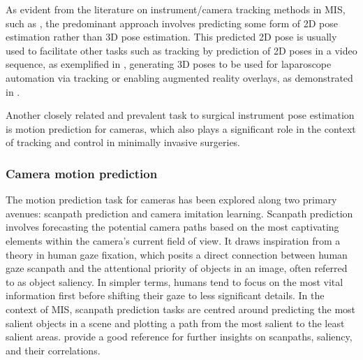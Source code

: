 \documentclass[times,twocolumn,final]{elsarticle}
\begin{document}
As evident from the literature on instrument/camera tracking methods in MIS, such as \citep{art_net,multi_semi_pose,concurrent_segmentation_iro_laina,li2021data}, the predominant approach involves predicting some form of 2D pose estimation rather than 3D pose estimation. This predicted 2D pose is usually used to facilitate other tasks such as tracking by prediction of 2D poses in a video sequence, as exemplified in \citet{concurrent_segmentation_iro_laina}, generating 3D poses to be used for laparoscope automation via tracking \citep{li2021data} or enabling augmented reality overlays, as demonstrated in \citet{art_net}.

Another closely related and prevalent task to surgical instrument pose estimation is motion prediction for cameras, which also plays a significant role in the context of tracking and control in minimally invasive surgeries.

\subsubsection{Camera motion prediction}
The motion prediction task for cameras has been explored along two primary avenues: scanpath prediction and camera imitation learning.
Scanpath prediction involves forecasting the potential camera paths based on the most captivating elements within the camera's current field of view. It draws inspiration from a theory in human gaze fixation, which posits a direct connection between human gaze scanpath and the attentional priority of objects in an image, often referred to as object saliency. In simpler terms, humans tend to focus on the most vital information first before shifting their gaze to less significant details. In the context of MIS, scanpath prediction tasks are centred around predicting the most salient objects in a scene and plotting a path from the most salient to the least salient areas.
\citet{Foulsham} provide a good reference for further insights on scanpaths, saliency, and their correlations.
\end{document}
